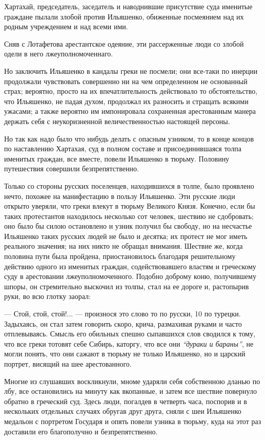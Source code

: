 \documentclass[a4paper,20pt]{article}
\begin{document}
Хартахай, председатель, заседатель и наводнившие присутствие суда именитые граждане пылали
злобой против Ильяшенко, обиженные посмеянием над их родным учреждением и над всеми ими. 

Сняв с Лотафетова арестантское одеяние, эти рассерженные люди 
со злобой одели в него лжеуполномоченнаго.

Но заключить Ильяшенко в кандалы греки не посмели; они все-таки по инерции
продолжали чувствовать совершенно ни на чем определенном не основанный страх;
вероятно, просто на их впечатлительность действовало то обстоятельство, что
Ильяшенко, не падая духом, продолжал их разносить и стращать всякими ужасами; а
также вероятно им импонировала сохраненная арестованным манера держать себя с
неукоризненной величественностью настоящей персоны.

Но так как надо было что нибудь делать с опасным узником, 
то в конце концов по наставлению Хартахая, 
суд в полном составе и присоединившаяся толпа
именитых граждан, все вместе, повели Ильяшенко в
тюрьму. Половину путешествия совершили безпрепятственно.

Только со стороны русских поселенцев, находившихся в толпе, было проявлено
нечто, похожее на манифестацию в пользу Ильяшенко. Эти русские люди открыто
уверяли, что греки влекут в тюрьму Великого Князя.  Конечно, если бы таких
протестантов находилось несколько сот человек, шествию не сдобровать; оно было
бы силою остановлено и узник получил бы свободу, но на несчастье Ильяшенко
таких русских людей не было и десятка; их протест не мог иметь реального
значения; на них никто не обращал внимания. Шествие же, когда половина пути
была пройдена, приостановилось благодаря решительному
действию одного из именитых граждан, содействовавшего
властям и греческому суду в арестовании лжеуполномоченного. 
Подобно доброму коню, получившему шпоры, он
стремительно выскочил из толпы, стал на ее дороге и,
растопырив руки, во всю глотку заорал:

— Стой, стой, стой!... — произнося это слово то по русски, 10 по турецки.
Задыхаясь, он стал затем говорить скоро, крича, размахивая руками и часто
отплевываясь. Смысль его обильных спешно сыпавшихся слов сводился к тому, что
все греки тотовят себе Сибирь, каторгу, что все они \emph{``дураки и бараны''},
не могли понять, что они сажают в тюрьму не только Ильяшенко, но и царский
портрет, висящий на шее арестованного.

Многие из слушавших воскликнули, мноме ударяли себя собственною дланью по лбу, все остановились
на минуту как вкопанные, и затем все шествие повернуло
обратно в греческий суд.  Здесь люди, погалдев в четверть
часа, поспорив и в нескольких отдельных случаях обругав друг друга, сняли с шеи Ильяшенко медальон с портретом
Государя и опять повели узника в тюрьму,
куда на этот раз доставили его благополучно и безпрепятственно.
\end{document}
